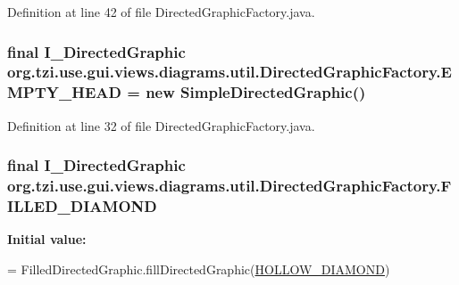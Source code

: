 Definition at line 42 of file Directed\-Graphic\-Factory.\-java.

\hypertarget{classorg_1_1tzi_1_1use_1_1gui_1_1views_1_1diagrams_1_1util_1_1_directed_graphic_factory_a10eb3d9dcee555801b4b93af32267482}{
\subsubsection[{E\-M\-P\-T\-Y\-\_\-\-H\-E\-A\-D}]{\setlength{\rightskip}{0pt plus 5cm}final {\bf I\-\_\-\-Directed\-Graphic} org.\-tzi.\-use.\-gui.\-views.\-diagrams.\-util.\-Directed\-Graphic\-Factory.\-E\-M\-P\-T\-Y\-\_\-\-H\-E\-A\-D = new {\bf Simple\-Directed\-Graphic}()\hspace{0.3cm}{\ttfamily [static]}}}\label{classorg_1_1tzi_1_1use_1_1gui_1_1views_1_1diagrams_1_1util_1_1_directed_graphic_factory_a10eb3d9dcee555801b4b93af32267482}


Definition at line 32 of file Directed\-Graphic\-Factory.\-java.

\hypertarget{classorg_1_1tzi_1_1use_1_1gui_1_1views_1_1diagrams_1_1util_1_1_directed_graphic_factory_abd23d1a02d51fb93415cb3b3586ebd5c}{
\subsubsection[{F\-I\-L\-L\-E\-D\-\_\-\-D\-I\-A\-M\-O\-N\-D}]{\setlength{\rightskip}{0pt plus 5cm}final {\bf I\-\_\-\-Directed\-Graphic} org.\-tzi.\-use.\-gui.\-views.\-diagrams.\-util.\-Directed\-Graphic\-Factory.\-F\-I\-L\-L\-E\-D\-\_\-\-D\-I\-A\-M\-O\-N\-D\hspace{0.3cm}{\ttfamily [static]}}}\label{classorg_1_1tzi_1_1use_1_1gui_1_1views_1_1diagrams_1_1util_1_1_directed_graphic_factory_abd23d1a02d51fb93415cb3b3586ebd5c}
{\bfseries Initial value\-:}
\begin{DoxyCode}
=
            FilledDirectedGraphic.fillDirectedGraphic(\hyperlink{classorg_1_1tzi_1_1use_1_1gui_1_1views_1_1diagrams_1_1util_1_1_directed_graphic_factory_a0881f95044b84bd97ccac1b4586fd328}{HOLLOW\_DIAMOND})
\end{DoxyCode}


